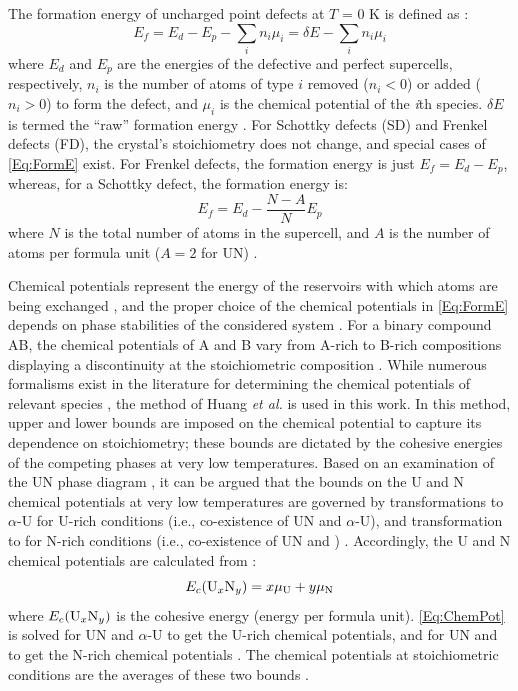 \documentclass[preprint, 12pt]{elsarticle}
\begin{document}
The formation energy of uncharged point defects at $T$ = 0 K is defined as \cite{Mishin1997I, VandeWalle2004, Anand2021}:
\begin{equation}
E_{f} = E_{d} - E_{p} - \sum_i n_i \mu_i = \delta E - \sum_i n_i \mu_i
\label{Eq:FormE}
\end{equation}
where $E_d$ and $E_p$ are the energies of the defective and perfect supercells, respectively, $n_i$ is the number of atoms of type $i$ removed ($n_i < 0$) or added ($n_i > 0$) to form the defect, and $\mu_i$ is the chemical potential of the \textit{i}th species. $\delta E$ is termed the ``raw'' formation energy \cite{Mishin1997I}. For Schottky defects (SD) and Frenkel defects (FD), the crystal's stoichiometry does not change, and special cases of \cref{Eq:FormE} exist. For Frenkel defects, the formation energy is just $E_{f} = E_{d} - E_{p}$, whereas, for a Schottky defect, the formation energy is:
\begin{equation}
E_f = E_{d} - \frac{N-A}{N} E_{p}
\end{equation}
where $N$ is the total number of atoms in the supercell, and $A$ is the number of atoms per formula unit ($A = 2$ for UN) \cite{Dorado2009}.

Chemical potentials represent the energy of the reservoirs with which atoms are being exchanged \cite{VandeWalle2004, Freysoldt2014}, and the proper choice of the chemical potentials in \cref{Eq:FormE} depends on phase stabilities of the considered system \cite{Freysoldt2014}. For a binary compound AB, the chemical potentials of A and B vary from A-rich to B-rich compositions displaying a discontinuity at the stoichiometric composition \cite{Hagen1996, Mishin1997I, Woodward1998}. While numerous formalisms exist in the literature for determining the chemical potentials of relevant species \cite{Mishin1997I, Bocharov2011, Hagen1996, Woodward1998, VandeWalle2004, Kocevski2022II}, the method of Huang \textit{et al.} \cite{Huang2020, Yang2021} is used in this work. In this method, upper and lower bounds are imposed on the chemical potential to capture its dependence on stoichiometry; these bounds are dictated by the cohesive energies of the competing phases at very low temperatures. Based on an examination of the UN phase diagram \cite{Okamoto1997, Uno2020}, it can be argued that the bounds on the U and N chemical potentials at very low temperatures are governed by transformations to $\alpha$-U for U-rich conditions (i.e., co-existence of UN and $\alpha$-U), and transformation to  for N-rich conditions (i.e., co-existence of UN and ) \cite{Huang2020, Yang2021}. Accordingly, the U and N chemical potentials are calculated from \cite{Yang2021}:
\begin{equation}
E_c(\mathrm{U}_{x}\mathrm{N}_{y}) = x \mu_{\ce{U}} + y \mu_{\ce{N}}
\label{Eq:ChemPot}
\end{equation}
where $E_c(\ce{U$_{x}$N$_{y}$})$ is the cohesive energy (energy per formula unit). \cref{Eq:ChemPot} is solved for UN and $\alpha$-U to get the U-rich chemical potentials, and for UN and  to get the N-rich chemical potentials \cite{Huang2020, Yang2021}. The chemical potentials at stoichiometric conditions are the averages of these two bounds \cite{Woodward1998}.
\end{document}
